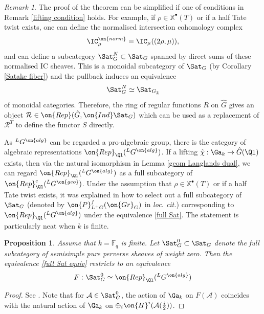 \documentclass[]{pcmi}
\theoremstyle{plain}
\newtheorem{prop}[equation]{Proposition}
\theoremstyle{remark}
\newtheorem{rmk}[equation]{Remark}
\theoremstyle{definition}
\newcommand{\bF}{{\mathbb F}}
\newcommand{\mA}{{\mathcal A}}
\newcommand{\mR}{{\mathcal R}}
\newcommand{\Gr}{{\on{Gr}}}
\def\xch{\mathbb{X}^\bullet}
\begin{document}
\begin{rmk}\label{simplify}
The proof of the theorem can be simplified if one of conditions in Remark \ref{lifting condition} holds. For example, if $\rho\in\xch(T)$  or if a half Tate twist exists, one can define the normalised intersection cohomology complex 
$$\IC_\mu^{\on{norm}}=\IC_\mu((2\rho,\mu)),$$ and can define a subcategory $\Sat_G^N\subset \Sat_G$ spanned by direct sums of these normalised IC sheaves. This is a monoidal subcategory of $\Sat_G$ (by Corollary \ref{Satake fiber}) and the pullback induces an equivalence 
$$\Sat_G^N\simeq \Sat_{G_{\bar k}}$$ 
of monoidal categories. Therefore, the ring of regular functions $R$ on $\hat G$ gives an object $\mR\in \on{Rep}(\hat G,{\on{Ind}\Sat_G})$ which can be used as a replacement of $\mR^T$ to define the functor $S$ directly.
\end{rmk}
As ${^L}G^{\on{alg}}$ can be regarded a pro-algebraic group, there is the category of algebraic representations $\on{Rep}_\Ql({^L}G^{\on{alg}})$. 
If a lifting $\tilde \chi:\Ga_k\to \hat G(\Ql)$ exists, then via the natural isomorphism in Lemma \ref{geom Langlands dual}, we can regard $\on{Rep}_\Ql({^L}G^{\on{alg}})$ as a full subcategory of $\on{Rep}^c_{\Ql}({^L}G^{\on{geo}})$. Under the assumption that $\rho\in \xch(T)$ or if a half Tate twist exists, it was explained in \cite{RZ} how to select out a full subcategory of $\Sat_G$ (denoted by $\on{P}_{L^+G}^f(\Gr_G)$ in \emph{loc. cit.}) corresponding to $\on{Rep}_\Ql({^L}G^{\on{alg}})$  under the equivalence \eqref{full Sat}. The statement is particularly neat when $k$ is finite. 
\begin{prop}
Assume that $k=\bF_q$ is finite. Let $\Sat_G^0\subset \Sat_G$ denote the full subcategory of semisimple pure perverse sheaves of weight zero. Then the equivalence \eqref{full Sat equiv} restricts to an equivalence
\[F:\Sat_G^0\simeq \on{Rep}_\Ql({^L}G^{\on{alg}})\]
\end{prop}
\begin{proof}See \cite[Remark A.9, Proposition A.10]{RZ}. Note that for $\mA\in\Sat_G^0$, the action of $\Ga_k$ on $F(\mA)$ coincides with the natural action of $\Ga_k$ on $\oplus_i \on{H}^i(\mA(\frac{i}{2}))$.
\end{proof}
\end{document}
